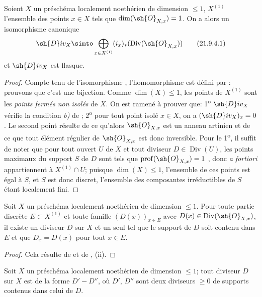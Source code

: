 \begin{proposition}[21.9.4]
\label{IV.21.9.4}
Soient $X$ un préschéma localement noethérien de dimension $\leq1$, $X^{(1)}$ l'ensemble des points $x\in X$ tels que $\dim(\sh{O}_{X,x})=1$.
On a alors un isomorphisme canonique
\[
\label{IV.21.9.4.1}
  \sh{D}iv_X\simto\bigoplus_{x\in X^{(1)}}(i_x)_*(\operatorname{Div}(\sh{O}_{X,x}))
  \tag{21.9.4.1}
\]
et $\sh{D}iv_X$ est flasque.
\end{proposition}

\begin{proof}
Compte tenu de l'isomorphisme , l'homomorphisme  est défini par :
prouvons que c'est une bijection.
Comme $\dim(X)\leq1$, les points de $X^{(1)}$ sont les \emph{points fermés non isolés} de $X$.
On est ramené à prouver que:
1\textsuperscript{o} $\sh{D}iv_X$ vérifie la condition \emph{b)} de ;
2\textsuperscript{o} pour tout point isolé $x\in X$, on a $(\sh{D}iv_X)_x=0$.
Le second point résulte de ce qu'alors $\sh{O}_{X,x}$ est un anneau artinien et de ce que tout élément régulier de $\sh{O}_{X,x}$ est donc inversible.
Pour le 1\textsuperscript{o}, il suffit de noter que pour tout ouvert $U$ de $X$ et tout diviseur $D\in\operatorname{Div}(U)$, les points maximaux du support $S$ de $D$ sont tels que $\operatorname{prof}(\sh{O}_{X,x})=1$ , donc \emph{a fortiori} appartiennent à $X^{(1)}\cap U$;
puisque $\dim(X)\leq1$, l'ensemble de ces points est égal à $S$, et $S$ est donc discret, l'ensemble des composantes irréductibles de $S$ étant localement fini.
\end{proof}

\begin{corollary}[21.9.5]
\label{IV.21.9.5}
Soit $X$ un préschéma localement noethérien de dimension $\leq1$.
Pour toute partie discrète $E\subset X^{(1)}$ et toute famille $(D(x))_{x\in E}$ avec $D(x)\in\operatorname{Div}(\sh{O}_{X,x})$, il existe un diviseur $D$ sur $X$ et un seul tel que le support de $D$ soit contenu dans $E$ et que $D_x=D(x)$ pour tout $x\in E$.
\end{corollary}

\begin{proof}
Cela résulte de  et de , (ii).
\end{proof}

\begin{corollary}[21.9.6]
\label{IV.21.9.6}
Soit $X$ un préschéma localement noethérien de dimension $\leq1$;
tout diviseur $D$ sur $X$ est de la forme $D'-D''$, où $D'$, $D''$ sont deux diviseurs $\geq0$ de supports contenus dans celui de $D$.
\end{corollary}

